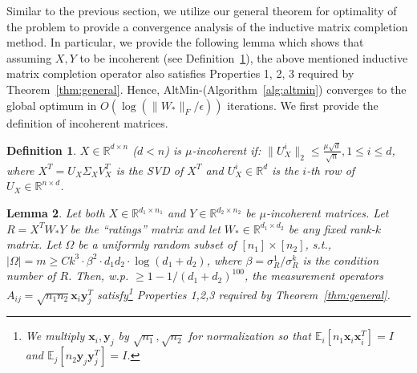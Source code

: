 \documentclass[11pt]{article}
\newtheorem{lemma}{Lemma}
\newtheorem{defn}[lemma]{Definition}
\newcommand{\R}{\mathbb{R}}
\newcommand{\tp}[1]{{#1}^{T}}
\newcommand{\E}{\mathbb{E}}
\newcommand{\ytj}{\tp{\y}_j}
\newcommand{\Wo}{W_*}
\newcommand{\x}{\bm{x}}
\newcommand{\y}{\bm{y}}
\newcommand{\yj}{\y_j}
\begin{document}
Similar to the previous section, we utilize our general theorem for optimality of the \lrrom problem to provide a convergence analysis of the inductive matrix completion method. In particular, we provide the following lemma which shows that assuming $X, Y$ to be incoherent (see Definition~\ref{defn:incoherence}), the above mentioned inductive matrix completion operator also satisfies Properties 1, 2, 3 required by Theorem~\ref{thm:general}. Hence, AltMin-\lrrom (Algorithm~\ref{alg:altmin}) converges to the global optimum in $O(\log (\|\Wo\|_F/\epsilon))$ iterations. We first provide the definition of incoherent matrices. 
\begin{defn}\label{defn:incoherence}
$X\in \mathbb{R}^{d\times n}$ ($d<n$) is $\mu$-incoherent if: $\|U_X^i\|_2\leq \frac{\mu\sqrt{d}}{\sqrt{n}}, 1\leq i\leq d$, where $X^T=U_X\Sigma_X\tp{V}_X$ is the SVD of $X^T$ and $U_X^i\in \R^d$ is the $i$-th row of $U_X\in \mathbb{R}^{n\times d}$. 
\end{defn}
\begin{lemma}\label{lemma:indmc}
Let both $X\in \mathbb{R}^{d_1\times n_1}$ and $Y\in \mathbb{R}^{d_2\times n_2}$ be $\mu$-incoherent  matrices. Let $R=\tp{X}\Wo Y$ be the ``ratings'' matrix and let $\Wo\in \mathbb{R}^{d_1\times d_2}$ be any fixed rank-$k$ matrix. Let $\Omega$ be a uniformly random subset of $[n_1]\times [n_2]$, s.t., $|\Omega|=m\geq C  k^3\cdot \beta^2\cdot d_1 d_2\cdot \log(d_1+d_2)$, where $\beta=\sigma_R^1/\sigma_R^k$ is the condition number of $R$. Then, w.p. $\geq 1-1/(d_1+d_2)^{100}$, the measurement operators $A_{ij}=\sqrt{n_1n_2}\x_i \tp{\y}_j$ satisfy\footnote{We multiply $\x_i, \y_j$ by $\sqrt{n_1}, \sqrt{n_2}$ for normalization so that $\E_{i}[n_1\x_i\x_i^T]=I$ and $\E_{j}[n_2\yj\ytj]=I$.} Properties 1,2,3 required by Theorem~\ref{thm:general}. 
\end{lemma}
\end{document}
